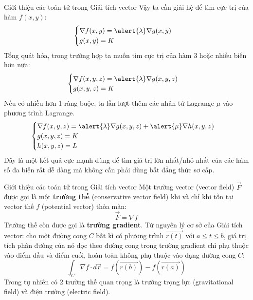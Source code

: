 \documentclass[8pt]{beamer}
\begin{document}
\begin{frame}{Giới thiệu các toán tử trong Giải tích vector}
Vậy ta cần giải hệ để tìm cực trị của hàm $f(x,y)$:
\begin{equation*}
\begin{cases}
	\nabla f(x,y)=\alert{\lambda}\nabla g(x,y)\\
	g(x,y)=K\\
\end{cases}
\end{equation*}
Tổng quát hóa, trong trường hợp ta muốn tìm cực trị của hàm $3$ hoặc nhiều biến hơn nữa:
\begin{equation*}
\begin{cases}
	\nabla f(x,y,z)=\alert{\lambda}\nabla g(x,y,z)\\
	g(x,y,z)=K\\
\end{cases}
\end{equation*}
Nếu có nhiều hơn $1$ ràng buộc, ta lần lượt thêm các nhân tử Lagrange $\mu$ vào phương trình Lagrange.
\begin{equation*}
\begin{cases}
	\nabla f(x,y,z)=\alert{\lambda}\nabla g(x,y,z)+\alert{\mu}\nabla h(x,y,z)\\
	g(x,y,z)=K\\
	h(x,y,z)=L\\
\end{cases}
\end{equation*}
 Đây là một kết quả cực mạnh dùng để tìm giá trị lớn nhất/nhỏ nhất của các hàm số đa biến rất dễ dàng mà không cần phải dùng bất đẳng thức sơ cấp.
\end{frame}
\begin{frame}{Giới thiệu các toán tử trong Giải tích vector}
Một trường vector (vector field) $\overrightarrow{F}$ được gọi là một \textbf{trường thế} (conservative vector field) khi và chỉ khi tồn tại vector thế $f$ (potential vector) thỏa mãn:
$$\overrightarrow{F}=\nabla f$$
Trường thế còn được gọi là \textbf{trường gradient}. Từ nguyên lý cơ sở của Giải tích vector: cho một đường cong $C$ bất kì có phương trình $\overrightarrow{r(t)}$ với $a\leq t\leq b$, giá trị tích phân đường của nó dọc theo đường cong trong trường gradient chỉ phụ thuộc vào điểm đầu và điểm cuối, hoàn toàn không phụ thuộc vào dạng đường cong $C$:
$$\int_{C}\nabla f \cdot d \overrightarrow{r}=f(\overrightarrow{r(b)})-f(\overrightarrow{r(a)})$$
Trong tự nhiên có 2 trường thế quan trọng là trường trọng lực (gravitational field) và điện trường (electric field).
\end{frame}
\end{document}

